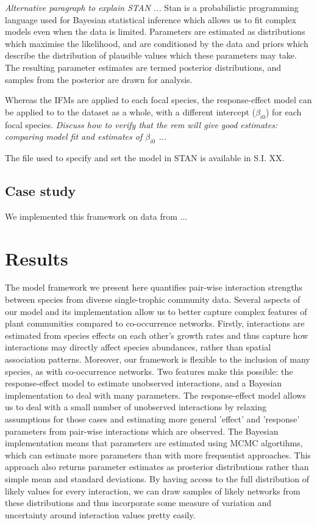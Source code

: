 \documentclass[a4,12pt]{article}
\begin{document}
        \textit{Alternative paragraph to explain STAN ...}
        Stan is a probabilistic programming language used for Bayesian statistical inference which allows us to fit complex models even when the data is limited. Parameters are estimated as distributions which maximise the likelihood, and are conditioned by the data and priors which describe the distribution of plausible values which these parameters may take. The resulting parameter estimates are termed posterior distributions, and samples from the posterior are drawn for analysis.
        
        Whereas the IFMs are applied to each focal species, the response-effect model can be applied to to the dataset as a whole, with a different intercept ($\beta_{i0}$) for each focal species. \textit{Discuss how to verify that the rem will give good estimates: comparing model fit and estimates of $\beta_{i0}$ ...}

        The file used to specify and set the model in STAN is available in S.I. XX. 
    
    \subsection{Case study}

        We implemented this framework on data from ...
        

\section{Results}


    The model framework we present here quantifies pair-wise interaction strengths between species from diverse single-trophic community data. Several aspects of our model and its implementation allow us to better capture complex features of plant communities compared to co-occurrence networks. Firstly, interactions are estimated from species effects on each other's growth rates and thus capture how interactions may directly affect species abundances, rather than spatial association patterns. Moreover, our framework is flexible to the inclusion of many species, as with co-occurrence networks. Two features make this possible: the response-effect model to estimate unobserved interactions, and a Bayesian implementation to deal with many parameters. The response-effect model allows us to deal with a small number of unobserved interactions by relaxing assumptions for those cases and estimating more general 'effect' and 'response' parameters from  pair-wise interactions which are observed. The Bayesian implementation means that parameters are estimated using MCMC algortihms, which can estimate more parameters than with more frequentist approaches. This approach also returns parameter estimates as prosterior distributions rather than simple mean and standard deviations. By having access to the full distribution of likely values for every interaction, we can draw samples of likely networks from these distributions and thus incorporate some measure of variation and uncertainty around interaction values pretty easily. \\
\end{document}
